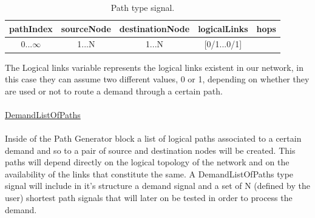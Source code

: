 \begin{table}[H]
	\centering
	\begin{tabular}{|c|c|c|c|c|}
		\hline
		pathIndex & sourceNode & destinationNode & logicalLinks & hops\\ \hline
		0...$\infty$& 1...N       & 1...N  & [0/1...0/1]  &    \\ \hline
	\end{tabular}
	\caption{Path type signal.}
	\label{path_signal}
\end{table}
The Logical links variable represents the logical links existent in our network, in this case they can assume two different values, 0 or 1, depending on whether they are used or not to route a demand through a certain path.\\ \\
\underline{DemandListOfPaths}\\
\\
Inside of the Path Generator block a list of logical paths associated to a certain demand and so to a pair of source and destination nodes will be created. This paths will depend directly on the logical topology of the network and on the availability of the links that constitute the same. A DemandListOfPaths type signal will include in it's structure a demand signal and a set of N (defined by the user) shortest path signals that will later on be tested in order to process the demand. 


